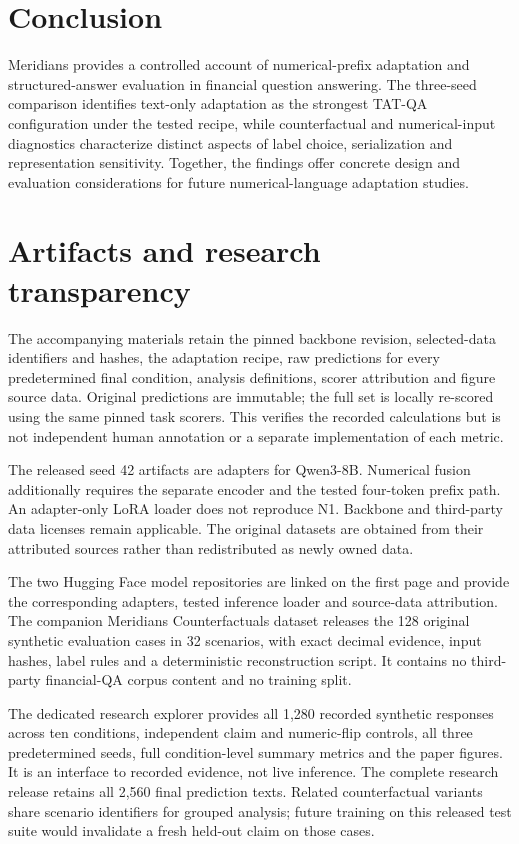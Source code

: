 \documentclass[11pt,a4paper]{article}
\begin{document}
\section{Conclusion}
Meridians provides a controlled account of numerical-prefix adaptation and structured-answer evaluation in financial question answering. The three-seed comparison identifies text-only adaptation as the strongest TAT-QA configuration under the tested recipe, while counterfactual and numerical-input diagnostics characterize distinct aspects of label choice, serialization and representation sensitivity. Together, the findings offer concrete design and evaluation considerations for future numerical-language adaptation studies.

\section{Artifacts and research transparency}
The accompanying materials retain the pinned backbone revision, selected-data identifiers and hashes, the adaptation recipe, raw predictions for every predetermined final condition, analysis definitions, scorer attribution and figure source data. Original predictions are immutable; the full set is locally re-scored using the same pinned task scorers. This verifies the recorded calculations but is not independent human annotation or a separate implementation of each metric.

The released seed 42 artifacts are adapters for Qwen3-8B. Numerical fusion additionally requires the separate encoder and the tested four-token prefix path. An adapter-only LoRA loader does not reproduce N1. Backbone and third-party data licenses remain applicable. The original datasets are obtained from their attributed sources rather than redistributed as newly owned data.

The two Hugging Face model repositories are linked on the first page and provide the corresponding adapters, tested inference loader and source-data attribution. The companion Meridians Counterfactuals dataset releases the 128 original synthetic evaluation cases in 32 scenarios, with exact decimal evidence, input hashes, label rules and a deterministic reconstruction script. It contains no third-party financial-QA corpus content and no training split.

The dedicated research explorer provides all 1,280 recorded synthetic responses across ten conditions, independent claim and numeric-flip controls, all three predetermined seeds, full condition-level summary metrics and the paper figures. It is an interface to recorded evidence, not live inference. The complete research release retains all 2,560 final prediction texts. Related counterfactual variants share scenario identifiers for grouped analysis; future training on this released test suite would invalidate a fresh held-out claim on those cases.
\end{document}
